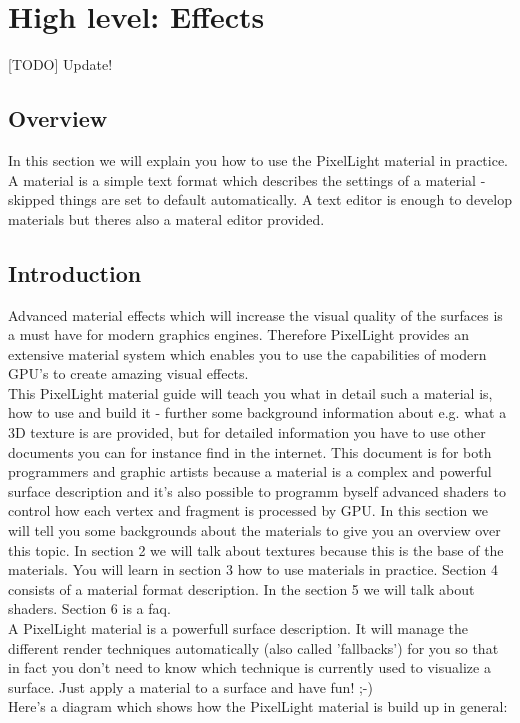 \chapter{High level: Effects}


[TODO] Update!


\section{Overview}
In this section we will explain you how to use the PixelLight material in practice. A material 
is a simple text format which describes the settings of a material - skipped things are set to
default automatically. A text editor is enough to develop materials but theres also a materal
editor provided.



\section{Introduction}
Advanced material effects which will increase the visual quality of the surfaces is a must have
for modern graphics engines. Therefore PixelLight provides an extensive material system which enables you
to use the capabilities of modern GPU's to create amazing visual effects.\\

This PixelLight material guide will teach you what in detail such a material is, how to use and
build it - further some background information about e.g. what a 3D texture is are provided, but for
detailed information you have to use other documents you can for instance find in the internet. This document
is for both programmers and graphic artists because a material is a complex
and powerful surface description and it's also possible to programm byself advanced shaders to
control how each vertex and fragment is processed by GPU. In this section we will tell you some
backgrounds about the materials to give you an overview over this topic. In section 2 we will talk
about textures because this is the base of the materials. You will learn in section 3 how to use
materials in practice. Section 4 consists of a material format description. In the section
5 we will talk about shaders. Section 6 is a faq.\\

A PixelLight material is a powerfull surface description. It will manage the different render techniques
automatically (also called 'fallbacks') for you so that in fact you don't need to know which technique is
currently used to visualize a surface. Just apply a material to a surface and have fun! ;-)\\
Here's a diagram which shows how the PixelLight material is build up in general:\\

